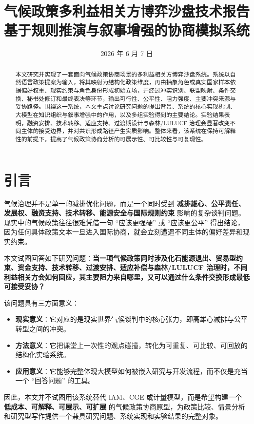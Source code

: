 \documentclass[12pt,a4paper]{ctexart}
\title{气候政策多利益相关方博弈沙盘技术报告\\\large 基于规则推演与叙事增强的协商模拟系统}
\author{}
\date{2026 年 6 月 7 日}
\begin{document}
\maketitle

\begin{abstract}
本文研究并实现了一套面向气候政策协商场景的多利益相关方博弈沙盘系统。系统以自然语言政策提案为输入，将其映射为结构化政策维度，再由抽象角色或真实国家样本依据偏好权重、现实约束与角色身份形成初始立场，并经过冲突识别、联盟映射、条件交换、秘书处修订和最终表决等环节，输出可行性、公平性、阻力强度、主要冲突来源与妥协路径。围绕这一系统，本文重点讨论研究问题的提出背景、系统的核心实现机制、大模型在知识组织与叙事增强中的作用，以及多组实验得到的主要结论。实验结果表明，融资安排、技术转移、适应支持、过渡期设计与森林/LULUCF 治理会显著改变不同主体的接受边界，并对共识形成路径产生实质影响。整体来看，该系统在保持可解释性的前提下，提高了气候政策协商分析的可展示性、可比较性与可复现性。
\end{abstract}

\tableofcontents
\newpage

\section{引言}
气候治理并不是单一的减排优化问题，而是一个同时受到 \textbf{减排雄心、公平责任、发展权、融资支持、技术转移、能源安全与国际规则约束} 影响的复杂谈判问题。现实中的气候政策往往很难凭借一句 ``应该更强硬'' 或 ``应该更公平'' 得出结论，因为任何具体政策文本一旦进入国际协商，就会立刻遭遇不同主体的偏好差异和现实约束。

本文试图回答如下研究问题：\textbf{当一项气候政策同时涉及化石能源退出、贸易型约束、资金支持、技术转移、过渡安排、适应补偿与森林/LULUCF 治理时，不同利益相关方会如何回应，其主要阻力来自哪里，又可以通过什么条件交换形成最低可接受妥协？}

该问题具有三方面意义：
\begin{itemize}
  \item \textbf{现实意义}：它对应的是现实世界气候谈判中的核心张力，即高雄心减排与公平转型之间的冲突。
  \item \textbf{方法意义}：它把课堂上一次性的观点碰撞，转化为可重复、可比较、可回放的结构化实验系统。
  \item \textbf{应用意义}：它能够完整体现大模型如何被嵌入研究与开发流程，而不仅是充当一个 ``回答问题'' 的工具。
\end{itemize}

因此，本文并不试图用该系统替代 IAM、CGE 或计量模型，而是希望构建一个 \textbf{低成本、可解释、可展示、可扩展} 的气候政策协商原型，为政策比较、情景分析和研究型写作提供一个兼具研究问题、系统实现和实验结果的完整对象。
\end{document}
